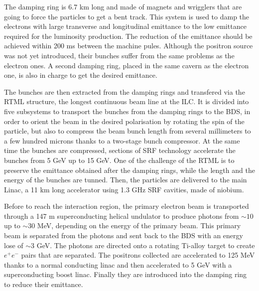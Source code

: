     The damping ring is 6.7 km long and made of magnets and wrigglers that are going to force the particles to get a bent track.
    This system is used to damp the electrons with large transverse and longitudinal emittance to the low emittance required for the luminosity production.
    The reduction of the emittance should be achieved within 200 ms between the machine pules.
    Although the positron source was not yet introduced, their bunches suffer from the same problems as the electron ones. 
    A second damping ring, placed in the same cavern as the electron one, is also in charge to get the desired emittance.

    The bunches are then extracted from the damping rings and transfered via the \gls{RTML} structure, the longest continuous beam line at the \gls{ILC}.
    It is divided into five subsystems to transport the bunches from the damping rings to the \gls{BDS}, in order to orient the beam in the desired polarisation by rotating the spin of the particle, but also to compress the beam bunch length from several millimeters to a few hundred microns thanks to a two-stage bunch compressor.
    At the same time the bunches are compressed, sections of \gls{SRF} technology accelerate the bunches from 5 GeV up to 15 GeV.
    One of the challenge of the \gls{RTML} is to preserve the emittance obtained after the damping rings, while the length and the energy of the bunches are tunned.
    Then, the particles are delivered to the main Linac, a 11 km long accelerator using 1.3 GHz \gls{SRF} cavities, made of niobium.

    Before to reach the interaction region, the primary electron beam is transported through a 147 m superconducting helical undulator to produce photons from $\sim 10$ up to $\sim 30$ MeV, depending on the energy of the primary beam.
    This primary beam is separated from the photons and sent back to the \gls{BDS} with an energy lose of $\sim 3$ GeV.
    The photons are directed onto a rotating Ti-alloy target to create $e^+e^-$ pairs that are separated.
    The positrons collected are accelerated to 125 MeV thanks to a normal conducting linac and then accelerated to 5 GeV with a superconducting boost linac.
    Finally they are introduced into the damping ring to reduce their emittance.

